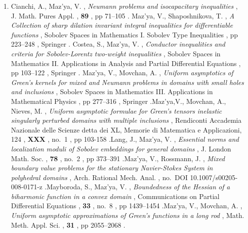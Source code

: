 \documentclass{article}
\newcommand{\authors}[1]{\item #1\ignorespaces}
\renewcommand{\title}[1]{, \textit{#1}\ignorespaces}
\newcommand{\journal}[1]{, {#1}\ignorespaces}
\newcommand{\book}[1]{, {#1}\ignorespaces}
\newcommand{\publisher}[1]{, {#1}\ignorespaces}
\newcommand{\volume}[1]{, \textbf{#1}\ignorespaces}
\newcommand{\no}[1]{, no.~{#1}\ignorespaces}
\newcommand{\pages}[1]{, pp #1\ignorespaces}
\newcommand{\jitem}[1]{.}
\begin{document}
\begin{enumerate}
\authors{Cianchi, A., Maz'ya, V.}
\title{Neumann problems and isocapacitary inequalities}
\journal{J. Math. Pures Appl.}
\volume{89}
\pages{71--105}
\jitem


\authors{ Maz'ya,  V., Shaposhnikova, T.}
\title {A Collection of sharp dilation invariant integral inequalities
for differentiable functions}
\book{Sobolev Spaces in Mathematics I. Sobolev Type Inequalities}
\pages{223--248}
\publisher{Springer}
\jitem


\authors{ Costea,  S., Maz'ya,  V.}
\title {Conductor inequalities and criteria for Sobolev-Lorentz two-weight inequalities}
\book{Sobolev Spaces in Mathematics II. Applications in Analysis and Partial Differential Equations}
\pages{103--122}
\publisher{Springer}
\jitem


\authors{ Maz'ya,  V., Movchan, A.}
\title {Uniform asymptotics  of Green's kernels for mixed and Neumann problems in domains with small holes and inclusions}
\book{Sobolev Spaces in Mathematics III. Applications in Mathematical Physics}
\pages{277--316}
\publisher{Springer}
\jitem

 \authors{Maz'ya,V.,  Movchan, A.,  Nieves, M.}
\title{Uniform asymptotic formulae for Green's tensors inelastic singularly
perturbed domains with multiple inclusions}
 \journal{Rendiconti Accademia Nazionale
delle Scienze detta dei XL, Memorie di Matematica e Applicazioni, 124}
\volume{XXX}
\no{1}
\pages{103-158}
\jitem


\authors{Lang, J., Maz'ya, V.}
\title {Essential norms and localization moduli of Sobolev
embeddings for general domains}
  \journal{J.  London Math.
Soc.}
\volume{78}
 \no{2}
 \pages{ 373--391}
\jitem

\authors{Maz'ya,  V., Rossmann,  J.}
\title {Mixed boundary value problems for the stationary Navier-Stokes System in
polyhedral domains}
 \journal{Arch. Rational Mech. Anal.}
\no{DOI 10.1007/s00205-008-0171-z}
\jitem






\authors{Mayboroda, S., Maz'ya, V.}
\title{Boundedness of the Hessian of a biharmonic function in a convex domain}
 \journal{Communications on Partial Differential Equations}
 \volume{33}
 \no{8}
  \pages{1439--1454}
\jitem


  \authors{Maz'ya, V., Movchan, A.}
 \title{Uniform asymptotic approximations of Green's functions in a long rod}
 \journal{Math. Meth. Appl. Sci.}
 \volume{31}
 \pages{2055--2068}
\jitem

\smallskip


\end{enumerate}
\end{document}
